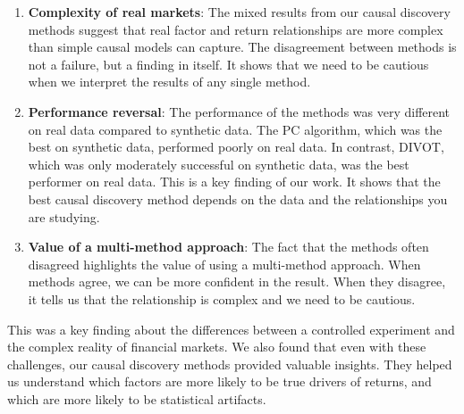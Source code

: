 \begin{enumerate}
    \item \textbf{Complexity of real markets}: The mixed results from our causal discovery methods suggest that real factor and return relationships are more complex than simple causal models can capture. The disagreement between methods is not a failure, but a finding in itself. It shows that we need to be cautious when we interpret the results of any single method.
    \item \textbf{Performance reversal}: The performance of the methods was very different on real data compared to synthetic data. The PC algorithm, which was the best on synthetic data, performed poorly on real data. In contrast, DIVOT, which was only moderately successful on synthetic data, was the best performer on real data. This is a key finding of our work. It shows that the best causal discovery method depends on the data and the relationships you are studying.
    \item \textbf{Value of a multi-method approach}: The fact that the methods often disagreed highlights the value of using a multi-method approach. When methods agree, we can be more confident in the result. When they disagree, it tells us that the relationship is complex and we need to be cautious.
\end{enumerate}

This was a key finding about the differences between a controlled experiment and the complex reality of financial markets. We also found that even with these challenges, our causal discovery methods provided valuable insights. They helped us understand which factors are more likely to be true drivers of returns, and which are more likely to be statistical artifacts.

